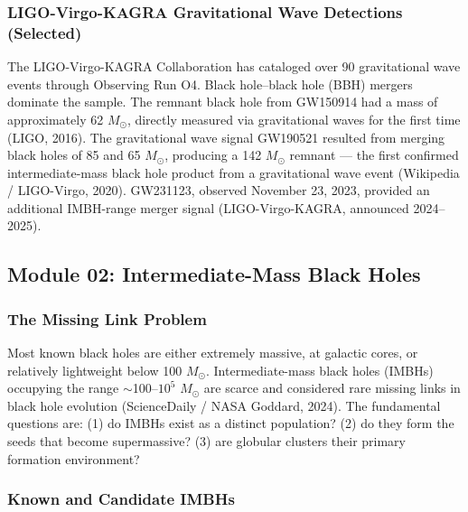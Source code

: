 \documentclass[11pt,letterpaper]{article}
\begin{document}
\subsubsection{LIGO-Virgo-KAGRA Gravitational Wave Detections (Selected)}

The LIGO-Virgo-KAGRA Collaboration has cataloged over 90 gravitational wave events through Observing Run O4. Black hole--black hole (BBH) mergers dominate the sample. The remnant black hole from GW150914 had a mass of approximately 62 $M_\odot$, directly measured via gravitational waves for the first time (LIGO, 2016). The gravitational wave signal GW190521 resulted from merging black holes of 85 and 65 $M_\odot$, producing a 142 $M_\odot$ remnant --- the first confirmed intermediate-mass black hole product from a gravitational wave event (Wikipedia / LIGO-Virgo, 2020). GW231123, observed November 23, 2023, provided an additional IMBH-range merger signal (LIGO-Virgo-KAGRA, announced 2024--2025).

\subsection{Module 02: Intermediate-Mass Black Holes}

\subsubsection{The Missing Link Problem}

Most known black holes are either extremely massive, at galactic cores, or relatively lightweight below 100 $M_\odot$. Intermediate-mass black holes (IMBHs) occupying the range $\sim$100--$10^5$ $M_\odot$ are scarce and considered rare missing links in black hole evolution (ScienceDaily / NASA Goddard, 2024). The fundamental questions are: (1) do IMBHs exist as a distinct population? (2) do they form the seeds that become supermassive? (3) are globular clusters their primary formation environment?

\subsubsection{Known and Candidate IMBHs}
\end{document}
